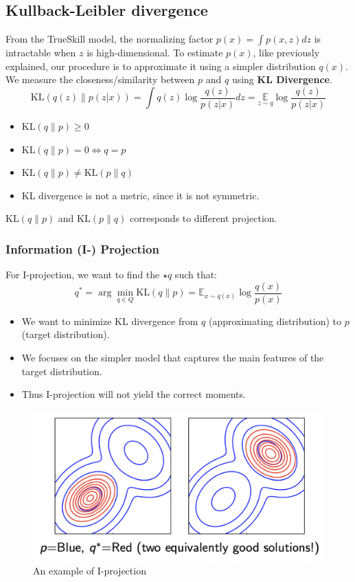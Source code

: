 \subsection{Kullback-Leibler divergence}
From the TrueSkill model, the normalizing factor $p(x)=\int p(x,z)dz$ is intractable when $z$ is high-dimensional. To estimate $p(x)$, like previously explained, our procedure is to approximate it using a simpler distribution $q(x)$. We measure the closeness/similarity between $p$ and $q$ using \textbf{KL Divergence}.
$$\mathrm{KL}(q(z) \| p(z | x))=\int q(z) \log \frac{q(z)}{p(z | x)} d z=\underset{z \sim q}{\mathbb{E}} \log \frac{q(z)}{p(z | x)}$$
\begin{itemize}
    \item $\mathrm{KL}(q \| p) \geq 0$
    \item $\mathrm{KL}(q \| p)=0 \Leftrightarrow q=p$
    \item $\mathrm{KL}(q \| p) \neq \mathrm{KL}(p \| q)$
    \item KL divergence is not a metric, since it is not symmetric.
\end{itemize}
$\mathrm{KL}(q \| p)$ and $\mathrm{KL}(p \| q)$ corresponds to different projection.

\subsubsection*{Information (I-) Projection}
For I-projection, we want to find the $\star{q}$ such that:
$$q^*=\arg \min _{q \in Q} \mathrm{KL}(q \| p)=\mathbb{E}_{x \sim q(x)} \log \frac{q(x)}{p(x)}$$
\begin{itemize}
    \item We want to minimize KL divergence from $q$ (approximating distribution) to $p$ (target distribution).
    \item We focuses on the simpler model that captures the main features of the target distribution.
    \item Thus I-projection will not yield the correct moments.
\end{itemize}
\begin{figure}[H]
    \centering
    \includegraphics[width = .4\linewidth]{figures/section8/figure_8_4.png}
    \caption{An example of I-projection}
    \label{fig:I-projection}
\end{figure}


